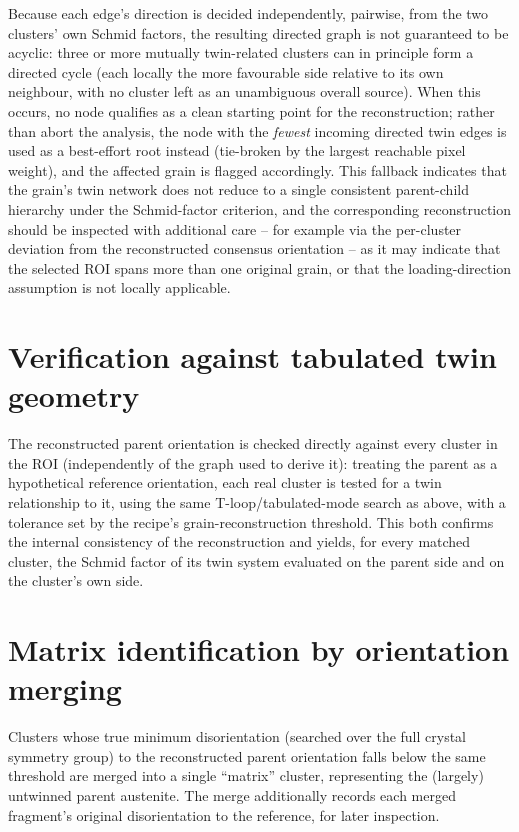 \documentclass[11pt]{article}
\begin{document}
Because each edge's direction is decided independently, pairwise, from the
two clusters' own Schmid factors, the resulting directed graph is not
guaranteed to be acyclic: three or more mutually twin-related clusters can
in principle form a directed cycle (each locally the more favourable side
relative to its own neighbour, with no cluster left as an unambiguous
overall source). When this occurs, no node qualifies as a clean starting
point for the reconstruction; rather than abort the analysis, the node
with the \emph{fewest} incoming directed twin edges is used as a
best-effort root instead (tie-broken by the largest reachable pixel
weight), and the affected grain is flagged accordingly. This fallback
indicates that the grain's twin network does not reduce to a single
consistent parent-child hierarchy under the Schmid-factor criterion, and
the corresponding reconstruction should be inspected with additional care
-- for example via the per-cluster deviation from the reconstructed
consensus orientation -- as it may indicate that the selected ROI spans
more than one original grain, or that the loading-direction assumption is
not locally applicable.

\section{Verification against tabulated twin geometry}

The reconstructed parent orientation is checked directly against every
cluster in the ROI (independently of the graph used to derive it): treating
the parent as a hypothetical reference orientation, each real cluster is
tested for a twin relationship to it, using the same T-loop/tabulated-mode
search as above, with a tolerance set by the recipe's grain-reconstruction
threshold. This both confirms the internal consistency of the
reconstruction and yields, for every matched cluster, the Schmid factor of
its twin system evaluated on the parent side and on the cluster's own side.

\section{Matrix identification by orientation merging}

Clusters whose true minimum disorientation (searched over the full crystal
symmetry group) to the reconstructed parent orientation falls below the
same threshold are merged into a single ``matrix'' cluster, representing
the (largely) untwinned parent austenite. The merge additionally records
each merged fragment's original disorientation to the reference, for later
inspection.
\end{document}
